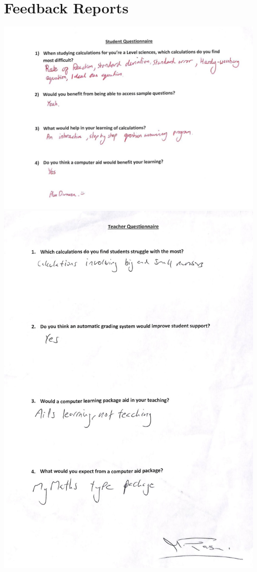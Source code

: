 \documentclass[a4paper,12pt]{report}
\begin{document}
\section{Feedback Reports}
\includegraphics{StudentQuestionnaire}
\includegraphics{TeacherQuestionnaire}
\end{document}
